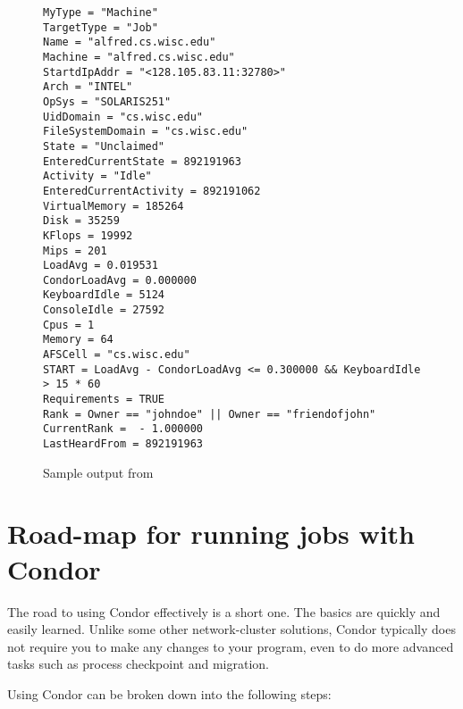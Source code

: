 %
%
%
\begin{center}
\begin{figure}
\CondorVerySmall
\begin{verbatim}
MyType = "Machine"
TargetType = "Job"
Name = "alfred.cs.wisc.edu"
Machine = "alfred.cs.wisc.edu"
StartdIpAddr = "<128.105.83.11:32780>"
Arch = "INTEL"
OpSys = "SOLARIS251"
UidDomain = "cs.wisc.edu"
FileSystemDomain = "cs.wisc.edu"
State = "Unclaimed"
EnteredCurrentState = 892191963
Activity = "Idle"
EnteredCurrentActivity = 892191062
VirtualMemory = 185264
Disk = 35259
KFlops = 19992
Mips = 201
LoadAvg = 0.019531
CondorLoadAvg = 0.000000
KeyboardIdle = 5124
ConsoleIdle = 27592
Cpus = 1
Memory = 64
AFSCell = "cs.wisc.edu"
START = LoadAvg - CondorLoadAvg <= 0.300000 && KeyboardIdle > 15 * 60
Requirements = TRUE
Rank = Owner == "johndoe" || Owner == "friendofjohn" 
CurrentRank =  - 1.000000
LastHeardFrom = 892191963
\end{verbatim}
\normalsize
\caption{\label{fig:CondorStatusL}Sample output from }
\end{figure}
\end{center}


\section{Road-map for running jobs with Condor}

The road to using Condor effectively is a short one.  The basics
are quickly and easily learned.  Unlike some other network-cluster
solutions, Condor typically does not require you to make any
changes to your program, even to do more advanced tasks such as
process checkpoint and migration. 

Using Condor can be broken down into the following steps:

